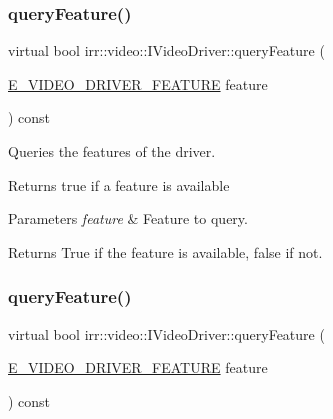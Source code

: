 \subsubsection{\texorpdfstring{query\+Feature()}{queryFeature()}\hspace{0.1cm}{\footnotesize\ttfamily [1/2]}}
{\footnotesize\ttfamily virtual bool irr\+::video\+::\+I\+Video\+Driver\+::query\+Feature (\begin{DoxyParamCaption}\item[{\hyperlink{namespaceirr_1_1video_a57b1721e42a79c5dcf8e830e3621e08f}{E\+\_\+\+V\+I\+D\+E\+O\+\_\+\+D\+R\+I\+V\+E\+R\+\_\+\+F\+E\+A\+T\+U\+RE}}]{feature }\end{DoxyParamCaption}) const\hspace{0.3cm}{\ttfamily [pure virtual]}}



Queries the features of the driver. 

Returns true if a feature is available 
\begin{DoxyParams}{Parameters}
{\em feature} & Feature to query. \\
\hline
\end{DoxyParams}
\begin{DoxyReturn}{Returns}
True if the feature is available, false if not. 
\end{DoxyReturn}
\mbox{\label{classirr_1_1video_1_1IVideoDriver_adde468368b77441ada246e1603da4f47}} 
\subsubsection{\texorpdfstring{query\+Feature()}{queryFeature()}\hspace{0.1cm}{\footnotesize\ttfamily [2/2]}}
{\footnotesize\ttfamily virtual bool irr\+::video\+::\+I\+Video\+Driver\+::query\+Feature (\begin{DoxyParamCaption}\item[{\hyperlink{namespaceirr_1_1video_a57b1721e42a79c5dcf8e830e3621e08f}{E\+\_\+\+V\+I\+D\+E\+O\+\_\+\+D\+R\+I\+V\+E\+R\+\_\+\+F\+E\+A\+T\+U\+RE}}]{feature }\end{DoxyParamCaption}) const\hspace{0.3cm}{\ttfamily [pure virtual]}}



